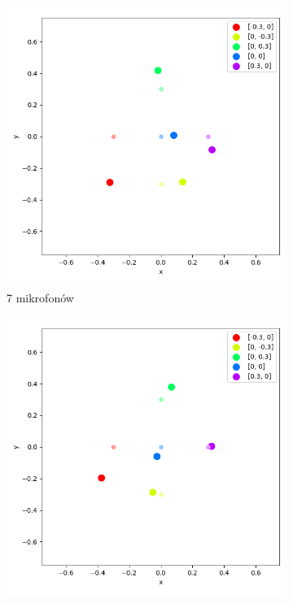 \begin{figure}[H]
    \ContinuedFloat\centering
    \begin{subfigure}{.5\textwidth}
        \centering
        \includegraphics[width=\linewidth]{pics/mult_lat_2d_num/positions_7_mean.png}
        \caption{7 mikrofonów}
        \label{pic:2d_7_num_mult}
    \end{subfigure}%
    \begin{subfigure}{.5\textwidth}
        \centering
        \includegraphics[width=\linewidth]{pics/mult_lat_2d_num/positions_8_mean.png}

\end{subfigure}
\end{figure}
